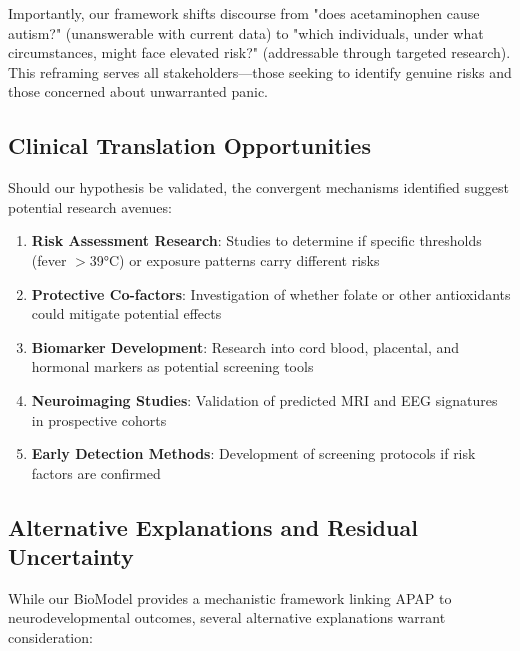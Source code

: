 \documentclass[11pt]{article}
\let\oldsubsection\subsection
\renewcommand{\subsection}[1]{\oldsubsection{#1}\setlength{\leftskip}{0.75em}}
\begin{document}
Importantly, our framework shifts discourse from "does acetaminophen cause autism?" (unanswerable with current data) to "which individuals, under what circumstances, might face elevated risk?" (addressable through targeted research). This reframing serves all stakeholders—those seeking to identify genuine risks and those concerned about unwarranted panic.

\subsection{Clinical Translation Opportunities}
Should our hypothesis be validated, the convergent mechanisms identified suggest potential research avenues:
\begin{enumerate}
\item \textbf{Risk Assessment Research}: Studies to determine if specific thresholds (fever $>$39°C) or exposure patterns carry different risks
\item \textbf{Protective Co-factors}: Investigation of whether folate or other antioxidants could mitigate potential effects
\item \textbf{Biomarker Development}: Research into cord blood, placental, and hormonal markers as potential screening tools
\item \textbf{Neuroimaging Studies}: Validation of predicted MRI and EEG signatures in prospective cohorts
\item \textbf{Early Detection Methods}: Development of screening protocols if risk factors are confirmed
\end{enumerate}

\subsection{Alternative Explanations and Residual Uncertainty}

While our BioModel provides a mechanistic framework linking APAP to neurodevelopmental outcomes, several alternative explanations warrant consideration:
\end{document}
